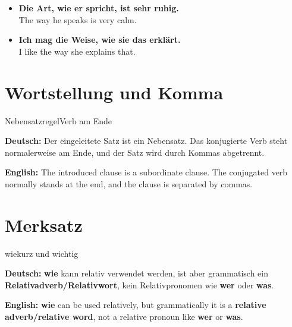 \documentclass[a4paper,11pt]{article}
\newcommand{\GermanText}[1]{\textbf{Deutsch: }#1\par}
\newcommand{\EnglishText}[1]{{\small\color{SoftGray}\textbf{English: }#1\par}}
\newcommand{\ExampleItem}[2]{\item \textbf{#1}\\{\small\color{SoftGray}#2}}
\begin{document}
\begin{exbox}

\begin{itemize}

\ExampleItem{Die Art, wie er spricht, ist sehr ruhig.}{The way he speaks is very calm.}

\ExampleItem{Ich mag die Weise, wie sie das erklärt.}{I like the way she explains that.}

\end{itemize}

\end{exbox}

\section{Wortstellung und Komma}

\begin{grammarentry}{Nebensatzregel}{Verb am Ende}

\GermanText{Der eingeleitete Satz ist ein Nebensatz. Das konjugierte Verb steht normalerweise am Ende, und der Satz wird durch Kommas abgetrennt.}

\EnglishText{The introduced clause is a subordinate clause. The conjugated verb normally stands at the end, and the clause is separated by commas.}

\end{grammarentry}

\section{Merksatz}

\begin{grammarentry}{wie}{kurz und wichtig}

\GermanText{\textbf{wie} kann relativ verwendet werden, ist aber grammatisch ein \textbf{Relativadverb/Relativwort}, kein Relativpronomen wie \textbf{wer} oder \textbf{was}.}

\EnglishText{\textbf{wie} can be used relatively, but grammatically it is a \textbf{relative adverb/relative word}, not a relative pronoun like \textbf{wer} or \textbf{was}.}

\end{grammarentry}
\end{document}
